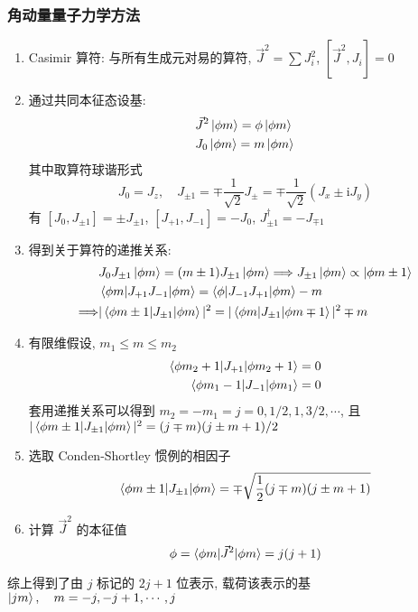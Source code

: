 \documentclass[12pt,a4paper]{article}%
\numberwithin{equation}{section}%
\newcommand\mi{\mathrm{i}}
\begin{document}
\subsubsection{角动量量子力学方法} %
\label{ssub:角动量量子力学方法}
\label{sub:lie_repr}
\begin{enumerate}
	\item Casimir 算符: 与所有生成元对易的算符, $\vec J^2 = \sum J_i^2$, $[\vec J^2, J_i] = 0$
	\item 通过共同本征态设基:
	\begin{align}
		&\vec J^2\ket{\phi m} = \phi\ket{\phi m} \\
		&J_0\ket{\phi m} = m\ket{\phi m}
	\end{align}
	其中取算符球谐形式
	\begin{equation}
		J_0 = J_z,\quad J_{\pm1} =\mp\frac 1{\sqrt 2}J_\pm = \mp\frac 1{\sqrt 2}\left(J_x \pm \mi J_y\right)
	\end{equation}
	有 $[J_0, J_{\pm1}] = \pm J_{\pm1}$, $[J_{+1}, J_{-1}] = -J_0$, $J_{\pm1}^\dagger = -J_{\mp1}$
	\item 得到关于算符的递推关系: 
	\begin{align}
		&J_0J_{\pm1}\ket{\phi m} = (m\pm 1)J_{\pm1}\ket{\phi m} \Longrightarrow
		J_{\pm1}\ket{\phi m} \propto \ket{\phi m\pm 1} \\
		&\braket{\phi m|J_{+1}J_{-1}|\phi m} = \braket{\phi|J_{-1}J_{+1}|\phi m} - m \\
		\Longrightarrow & |\braket{\phi m\pm 1|J_{\pm1}|\phi m}|^2 = 
		|\braket{\phi m|J_{\pm1}|\phi m\mp 1}|^2 \mp m
	\end{align}
	\item 有限维假设, $m_1\le m \le m_2$
	\begin{align}
		\braket{\phi m_2 + 1|J_{+1}|\phi m_2+1} = 0 \\
		\braket{\phi m_1 - 1|J_{-1}|\phi m_1} = 0
	\end{align}
	套用递推关系可以得到 $m_2 = - m_1 = j = 0, 1/2, 1, 3/2, \cdots$, 且 $|\braket{\phi m \pm 1|J_{\pm1}|\phi m}|^2 = (j\mp m)(j\pm m + 1)/2$
	\item 选取 Conden-Shortley 惯例的相因子
	\begin{align}
		\braket{\phi m \pm 1|J_{\pm1}|\phi m} = \mp\sqrt{\frac 12(j\mp m)(j\pm m + 1)}
	\end{align}
	\item 计算 $\vec J^2$ 的本征值
	\begin{equation}
		\phi = \braket{\phi m|\vec J^2|\phi m} = j(j+1)
	\end{equation}
\end{enumerate}
综上得到了由 $j$ 标记的 $2j+1$ 位表示, 载荷该表示的基 $\ket{jm},\quad m = -j, -j+1, \cdots, j$
\end{document}
